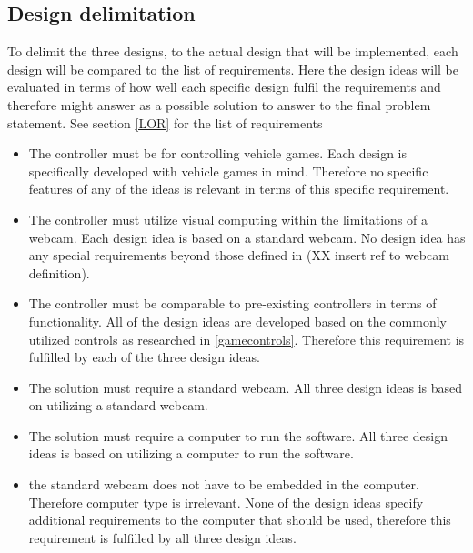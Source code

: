 \subsection{Design delimitation}

To delimit the three designs, to the actual design that will be implemented, each design will be compared to the list of requirements. Here the design ideas will be evaluated in terms of how well each specific design fulfil the requirements and therefore might answer as a possible solution to answer to the final problem statement. See section \ref{LOR} for the list of requirements

\begin{itemize}
\item The controller must be for controlling vehicle games.\newline
Each design is specifically developed with vehicle games in mind. Therefore no specific features of any of the ideas is relevant in terms of this specific requirement.

\item The controller must utilize visual computing within the limitations of a webcam.\newline
Each design idea is based on a standard webcam. No design idea has any special requirements beyond those defined in (XX insert ref to webcam definition). 

\item The controller must be comparable to pre-existing controllers in terms of functionality.\newline
All of the design ideas are developed based on the commonly utilized controls as researched in \ref{gamecontrols}. Therefore this requirement is fulfilled by each of the three design ideas.

\item 	The solution must require a standard webcam.\newline
All three design ideas is based on utilizing a standard webcam.

\item The solution must require a computer to run the software.\newline
All three design ideas is based on utilizing a computer to run the software.

\item the standard webcam does not have to be embedded in the computer. Therefore computer type is irrelevant.\newline
None of the design ideas specify additional requirements to the computer that should be used, therefore this requirement is fulfilled by all three design ideas.


\end{itemize}
